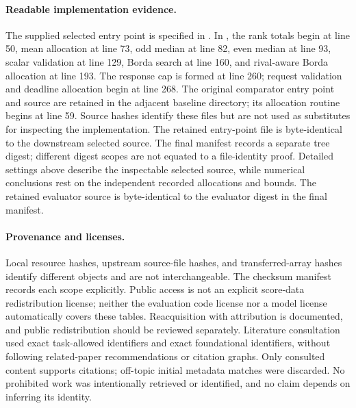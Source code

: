 \documentclass{article}
\begin{document}
\paragraph{Readable implementation evidence.}
The supplied selected entry point is specified in
.
In , the rank totals begin at line 50, mean allocation at line 73, odd median at line 82, even median at line 93, scalar validation at line 129, Borda search at line 160, and rival-aware Borda allocation at line 193. The response cap is formed at line 260; request validation and deadline allocation begin at line 268. The original comparator entry point and source are retained in the adjacent baseline directory; its allocation routine begins at line 59. Source hashes identify these files but are not used as substitutes for inspecting the implementation.
The retained entry-point file is byte-identical to the downstream selected source. The final manifest records a separate tree digest; different digest scopes are not equated to a file-identity proof. Detailed settings above describe the inspectable selected source, while numerical conclusions rest on the independent recorded allocations and bounds. The retained evaluator source is byte-identical to the evaluator digest in the final manifest.

\paragraph{Provenance and licenses.}
Local resource hashes, upstream source-file hashes, and transferred-array hashes identify different objects and are not interchangeable. The checksum manifest records each scope explicitly. Public access is not an explicit score-data redistribution license; neither the evaluation code license nor a model license automatically covers these tables. Reacquisition with attribution is documented, and public redistribution should be reviewed separately. Literature consultation used exact task-allowed identifiers and exact foundational identifiers, without following related-paper recommendations or citation graphs. Only consulted content supports citations; off-topic initial metadata matches were discarded. No prohibited work was intentionally retrieved or identified, and no claim depends on inferring its identity.
\end{document}
